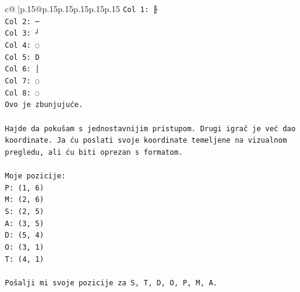 \documentclass{article}
\begin{document}
{\begin{supertabular}{c@{$\;$}|p{.15\linewidth}@{}p{.15\linewidth}p{.15\linewidth}p{.15\linewidth}p{.15\linewidth}p{.15\linewidth}}
{{{\texttt{Col 1: ╟} \\
\texttt{Col 2: ─} \\
\texttt{Col 3: ┘} \\
\texttt{Col 4: ◌} \\
\texttt{Col 5: D} \\
\texttt{Col 6: │} \\
\texttt{Col 7: ◌} \\
\texttt{Col 8: ◌} \\
\texttt{Ovo je zbunjujuće.} \\
\\ 
\texttt{Hajde da pokušam s jednostavnijim pristupom. Drugi igrač je već dao koordinate. Ja ću poslati svoje koordinate temeljene na vizualnom pregledu, ali ću biti oprezan s formatom.} \\
\\ 
\texttt{Moje pozicije:} \\
\texttt{P: (1, 6)} \\
\texttt{M: (2, 6)} \\
\texttt{S: (2, 5)} \\
\texttt{A: (3, 5)} \\
\texttt{D: (5, 4)} \\
\texttt{O: (3, 1)} \\
\texttt{T: (4, 1)} \\
\\ 
\texttt{Pošalji mi svoje pozicije za S, T, D, O, P, M, A.} \\
            }
        }
    }
     \\ \\


\end{supertabular}}
\end{document}
